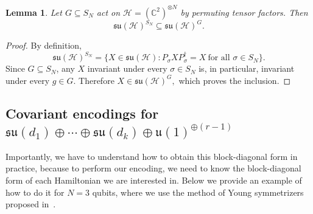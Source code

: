 \documentclass[10pt,twocolumn,superscriptaddress,aps,amsmath,amssymb,citeautoscript,floatfix,prx]{revtex4-2}
\theoremstyle{plain}
\theoremstyle{plain}
\theoremstyle{plain}
\theoremstyle{plain}
\theoremstyle{plain}
\theoremstyle{plain}
\theoremstyle{plain}
\newtheorem{smlemma}[smtheorem]{Lemma}
\theoremstyle{definition}
\theoremstyle{plain}
\begin{document}
\begin{appendix}
\begin{smlemma}\label{lem:subgroup_su_inclusion}
Let \(G\subseteq S_N\) act on \(\mathcal H=(\mathbb C^2)^{\otimes N}\) by permuting tensor factors. Then
\[
    \mathfrak{su}(\mathcal H)^{S_N}
    \subseteq
    \mathfrak{su}(\mathcal H)^G .
\]
\end{smlemma}

\begin{proof}
By definition,
\[
    \mathfrak{su}(\mathcal H)^{S_N}
    =
    \{X\in\mathfrak{su}(\mathcal H): P_\sigma X P_\sigma^\dagger=X
    \ \text{for all } \sigma\in S_N\}.
\]
Since \(G\subseteq S_N\), any \(X\) invariant under every \(\sigma\in S_N\) is, in particular, invariant under every \(g\in G\). Therefore
\(
    X\in\mathfrak{su}(\mathcal H)^G,
\)
which proves the inclusion.
\end{proof}

\subsection{Covariant encodings for \texorpdfstring{%
$\mathfrak{su}(d_1)\oplus\cdots\oplus\mathfrak{su}(d_k)\oplus \mathfrak{u}(1)^{\oplus(r-1)}$%
}{su(d1) plus ... plus su(dk) plus u(1)(r-1)}}
\label{subsec:supple_cov_block_enc}

Importantly, we have to understand how to obtain this block-diagonal form in practice, because to perform our encoding, we need to know the block-diagonal form of each Hamiltonian we are interested in.
Below we provide an example of how to do it for $N=3$ qubits, where we use the method of Young symmetrizers proposed in~\cite{DAlessandroHartwig2021}.


\end{appendix}
\end{document}
